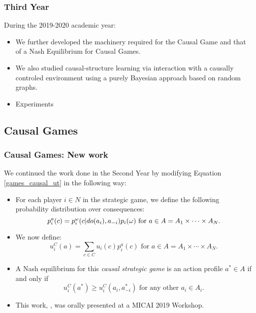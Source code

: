 \documentclass{beamer}
\theoremstyle{plain}
\begin{document}
\begin{frame}
\frametitle{Third Year}
During the 2019-2020 academic year:
\begin{itemize}
\item We further developed the machinery required for the Causal Game and that of a Nash Equilibrium for Causal Games.
\item We also studied causal-structure learning via interaction with a causally controled environment using a purely Bayesian approach based on random graphs.
\item Experiments
\end{itemize}
\end{frame}

\subsection{Causal Games}
\begin{frame}
\frametitle{Causal Games: New work}
We continued the work done in the Second Year by modifying Equation \ref{games_causal_ut} in the following way:
\begin{itemize}
\item For each player $i \in N$ in the strategic game, we define the following probability distribution over consequences:
\begin{equation}{\label{causal_utility}}
p^a_i (c) =  p^\omega_i (c | do(a_i), a_{-i}) p_i(\omega)\textrm{ for } a \in A=A_1 \times \cdots \times A_N.
\end{equation}
\item We now define:
\begin{equation}
u^C_i (a) = \sum_{c \in C}  u_i(c) p^a_i (c) \textrm{ for } a \in A=A_1 \times \cdots \times A_N.
\end{equation}
\item A Nash equilibrium for this \textit{causal strategic game} is an action profile $a^\ast \in A$ if and only if
\begin{equation}
 u^C_i(a^\ast) \geq u^C_i(a_i, a^\ast_{-i}) \textrm{ for any other } a_i \in A_i. 
 \end{equation}
\item This work, \cite{gonzalez2019games}, was orally presented at a MICAI 2019 Workshop.
\end{itemize}
\end{frame}
\end{document}
